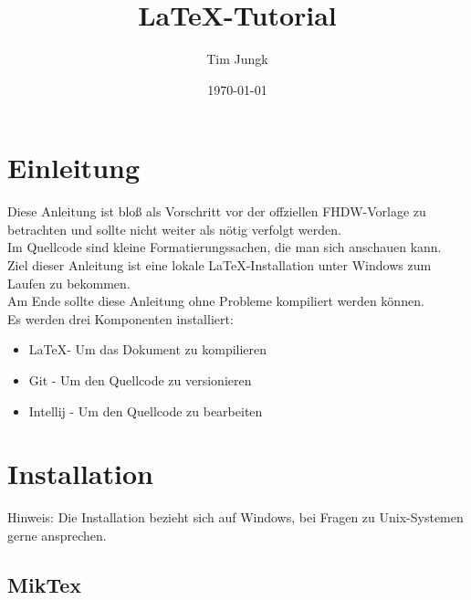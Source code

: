 \documentclass[11pt]{article}
\title{\LaTeX-Tutorial}
\author{Tim Jungk}
\date{ \today }
\begin{document}
    \maketitle

    \tableofcontents

    \clearpage


    \section{Einleitung}\label{sec:einleitung}

    Diese Anleitung ist bloß als Vorschritt vor der offziellen FHDW-Vorlage zu betrachten und sollte nicht weiter als nötig verfolgt werden. \\
    Im Quellcode sind kleine Formatierungssachen, die man sich anschauen kann. \\

    Ziel dieser Anleitung ist eine lokale \LaTeX-Installation unter Windows zum Laufen zu bekommen.\\
    Am Ende sollte diese Anleitung ohne Probleme kompiliert werden können.\\

    Es werden drei Komponenten installiert:

    \begin{itemize}
        \item \LaTeX - Um das Dokument zu kompilieren
        \item Git - Um den Quellcode zu versionieren
        \item Intellij - Um den Quellcode zu bearbeiten
    \end{itemize}


    \section{Installation}\label{sec:installation}

    \begin{center}
        Hinweis: Die Installation bezieht sich auf Windows, bei Fragen zu Unix-Systemen gerne ansprechen.
    \end{center}

    \subsection{MikTex}\label{subsec:miktex}
\end{document}
